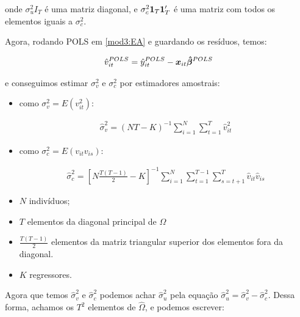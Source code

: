 \documentclass[11pt,oneside,a4paper]{article}
\numberwithin{equation}{section}
\begin{document}
\noindent
onde
$\sigma^{2}_{u} I_{T}$ 
é uma matriz diagonal, e 
$\sigma_{c}^{2} \boldsymbol{1}_{T} \boldsymbol{1}_{T}'$ é uma matriz com todos os elementos iguais a $\sigma_{c}^{2}$.

Agora, rodando POLS em \eqref{mod3:EA} e guardando os resíduos, temos:

\vspace{-1 em}
\begin{align*}
\hat{v}_{it}^{POLS}
= 
\hat{y}_{it}^{POLS} - \boldsymbol{x}_{it} \boldsymbol{\hat{\beta}}^{POLS}
\end{align*}

\noindent
e conseguimos estimar $\sigma_{v}^{2}$ e $\sigma_{c}^{2}$ por estimadores amostrais:

\begin{itemize}\itemsep0pt
\item 
como $\sigma_{v}^{2} = E(v_{it}^{2})$:

\vspace{-1.5 em}
\begin{align*}
\hat{\sigma}_{v}^{2} =
(NT - K)^{-1} 
\sum_{i=1}^{N}
\sum_{t=1}^{T}
\hat{v}_{it}^2
\end{align*}
\vspace{-1.5 em}

\item 
como $\sigma_{c}^{2} = E(v_{it} v_{is})$:

\vspace{-1.5 em}
\begin{align*}
\hat{\sigma}_{c}^{2} =
\left[ N \frac{T ( T-1 )}{2} - K  \right]^{-1}
\sum_{i=1}^{N}
\sum_{t=1}^{T-1}
\sum_{s=t+1}^{T}
\hat{v}_{it} \hat{v}_{is}
\end{align*}
\vspace{-1.5 em}

\item $N$ indivíduos;

\item $T$ elementos da diagonal principal de $\Omega$

\item $\frac{T ( T - 1)}{2}$ elementos da matriz triangular superior dos elementos fora da diagonal.

\item $K$ regressores.
\end{itemize}

Agora que temos $\hat{\sigma}^2_{v}$ e $\hat{\sigma}^2_{c}$ podemos achar $\hat{\sigma}^{2}_{u}$ pela equação $\boxed{\hat{\sigma}_{u}^{2} = \hat{\sigma}_{v}^{2} - \hat{\sigma}_{c}^{2}}$.
Dessa forma, achamos os $T^2$ elementos de $\widehat{\Omega}$, e podemos escrever:
\end{document}
